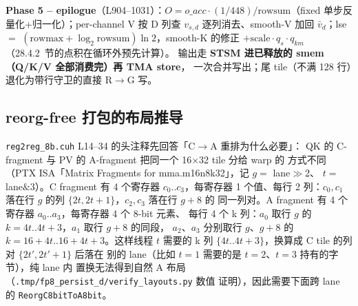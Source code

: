\textbf{Phase 5 -- epilogue}（L904--1031）：$O = o\_acc\cdot(1/448)/
\mathrm{rowsum}$（fixed 单步反量化+归一化）；per-channel V 按 D 列查
$v_{s,d}$ 逐列消去、smooth-V 加回 $\bar v_d$；lse $=$
$(\mathrm{rowmax}+\log_2\mathrm{rowsum})\ln2$，smooth-K 的修正
$+\mathrm{scale}\cdot q_s\cdot q_{km}$（28.4.2~节的点积在循环外预先计算）。
输出走 \textbf{STSM 进已释放的 smem（Q/K/V 全部消费完）再 TMA store}，
一次合并写出；尾 tile（不满 128 行）退化为带行守卫的直接 R$\to$G 写。

\subsection{reorg-free 打包的布局推导}

\texttt{reg2reg\_8b.cuh} L14--34 的头注释先回答「C$\to$A 重排为什么必要」：
QK 的 C-fragment 与 PV 的 A-fragment 把同一个 16$\times$32 tile 分给 warp 的
方式不同（PTX ISA「Matrix Fragments for mma.m16n8k32」，记 $g=$ lane$\gg$2、
$t=$ lane$\&$3）。C fragment 有 4 个寄存器 $c_0..c_3$，每寄存器 1 个值、每行
2 列：$c_0,c_1$ 落在行 $g$ 的列 $\{2t,2t{+}1\}$，$c_2,c_3$ 落在行 $g{+}8$ 的
同一列对。A fragment 有 4 个寄存器 $a_0..a_3$，每寄存器 4 个 8-bit 元素、
每行 4 个 k 列：$a_0$ 取行 $g$ 的 $k=4t..4t{+}3$，$a_1$ 取行 $g{+}8$ 的同段，
$a_2$、$a_3$ 分别取行 $g$、$g{+}8$ 的 $k=16{+}4t..16{+}4t{+}3$。这样线程 $t$
需要的 k 列 $\{4t..4t{+}3\}$，换算成 C tile 的列对 $\{2t',2t'{+}1\}$ 后落在
别的 lane（比如 $t{=}1$ 需要的是 $t{=}2$、$t{=}3$ 持有的字节），纯 lane 内
置换无法得到自然 A 布局（\texttt{.tmp/fp8\_persist\_d/verify\_layouts.py} 数值
证明），因此需要下面跨 lane 的 \texttt{ReorgC8bitToA8bit}。

